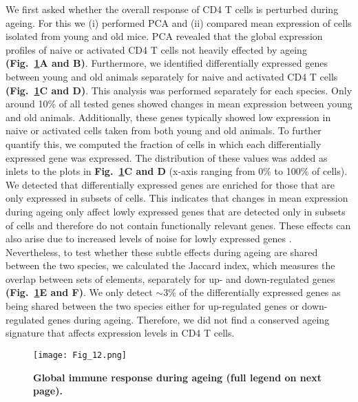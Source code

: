 We first asked whether the overall response of CD4\plus{} T cells is perturbed during ageing. 
For this we (i) performed PCA and (ii) compared mean expression of cells isolated from young and old mice. 
PCA revealed that the global expression profiles of naive or activated CD4\plus{} T cells not heavily effected by ageing \textbf{(Fig.~\ref{fig1:mean_expression_ageing}A and B)}. 
Furthermore, we identified differentially expressed genes between young and old animals separately for naive and activated CD4\plus{} T cells \textbf{(Fig.~\ref{fig1:mean_expression_ageing}C and D)}. 
This analysis was performed separately for each species. 
Only around 10\% of all tested genes showed changes in mean expression between young and old animals. 
Additionally, these genes typically showed low expression in naive or activated cells taken from both young and old animals. 
To further quantify this, we computed the fraction of cells in which each differentially expressed gene was expressed. 
The distribution of these values was added as inlets to the plots in \textbf{Fig.~\ref{fig1:mean_expression_ageing}C and D} (x-axis ranging from 0\% to 100\% of cells). 
We detected that differentially expressed genes are enriched for those that are only expressed in subsets of cells. 
This indicates that changes in mean expression during ageing only affect lowly expressed genes that are detected only in subsets of cells and therefore do not contain functionally relevant genes. 
These effects can also arise due to increased levels of noise for lowly expressed genes \citep{Brennecke2013}. \\

Nevertheless, to test whether these subtle effects during ageing are shared between the two species, we calculated the Jaccard index, which measures the overlap between sets of elements, separately for up- and down-regulated genes \textbf{(Fig.~\ref{fig1:mean_expression_ageing}E and F)}. 
We only detect $\sim$3\% of the differentially expressed genes as being shared between the two species either for up-regulated genes or down-regulated genes during ageing. 
Therefore, we did not find a conserved ageing signature that affects expression levels in CD4\plus{} T cells.

\begin{figure}[!ht]
\centering
\texttt{[image: Fig\_12.png]}
\caption[Global immune response during ageing]{\textbf{Global immune response during ageing (full legend on next page).}}
\label{fig1:mean_expression_ageing}
\end{figure}

